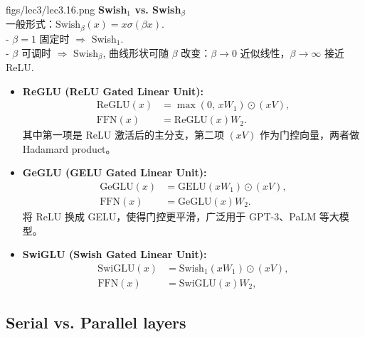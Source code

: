 \MarginImageWithNote
{figs/lec3/lec3.16.png}
{}
{
\textbf{Swish$_1$ vs. Swish$_\beta$}\\[0.3em]
一般形式：$\mathrm{Swish}_\beta(x)=x\sigma(\beta x)$.\\
- $\beta=1$ 固定时 $\Rightarrow$ Swish$_1$.\\
- $\beta$ 可调时 $\Rightarrow$ Swish$_\beta$, 曲线形状可随 $\beta$ 改变：$\beta\to0$ 近似线性，$\beta\to\infty$ 接近 ReLU.
}

\begin{itemize}
  \item \textbf{ReGLU (ReLU Gated Linear Unit):}
  \begin{align*}
    \mathrm{ReGLU}(x) &= \max(0,\, xW_1) \odot (xV), \\
    \mathrm{FFN}(x)   &= \mathrm{ReGLU}(x)W_2.
  \end{align*}
  其中第一项是 ReLU 激活后的主分支，第二项 $(xV)$ 作为门控向量，两者做 Hadamard product。

  \item \textbf{GeGLU (GELU Gated Linear Unit):}
  \begin{align*}
    \mathrm{GeGLU}(x) &= \mathrm{GELU}(xW_1) \odot (xV), \\
    \mathrm{FFN}(x)   &= \mathrm{GeGLU}(x)W_2.
  \end{align*}
  将 ReLU 换成 GELU，使得门控更平滑，广泛用于 GPT-3、PaLM 等大模型。

  \item \textbf{SwiGLU (Swish Gated Linear Unit):}
  \begin{align*}
    \mathrm{SwiGLU}(x) &= \mathrm{Swish_1}(xW_1) \odot (xV), \\
    \mathrm{FFN}(x)    &= \mathrm{SwiGLU}(x)W_2,
  \end{align*}
\end{itemize}




\clearpage
\subsection{Serial vs. Parallel layers}



